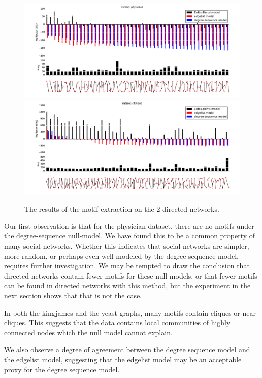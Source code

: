 \begin{figure}[h]
  \includegraphics[width=\textwidth]{./images/physicians/compare-plot.pdf}\\
  \includegraphics[width=\textwidth]{./images/citations/compare-plot.pdf}\\
  \caption{The results of the motif extraction on the 2 directed networks.}
  \label{figure:plot-dir}
\end{figure}

Our first observation is that for the physician dataset, there are no motifs under the degree-sequence null-model. We have found this to be a common property of many social networks. Whether this indicates that social networks are simpler, more random, or perhaps even well-modeled by the degree sequence model, requires further investigation. We may be tempted to draw the conclusion that directed networks contain fewer motifs for these null models, or that fewer motifs can be found in directed networks with this method, but the experiment in the next section shows that that is not the case. 

In both the kingjames and the yeast graphs, many motifs contain cliques or near-cliques. This suggests that the data contains local communities of highly connected nodes which the null model cannot explain.

We also observe a degree of agreement between the degree sequence model and the edgelist model, suggesting that the edgelist model may be an acceptable proxy for the degree sequence model.

